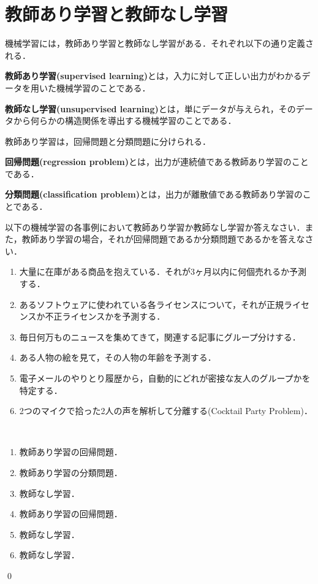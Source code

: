 \section{教師あり学習と教師なし学習}

機械学習には，教師あり学習と教師なし学習がある．それぞれ以下の通り定義される．
\begin{defi}[教師あり学習]
{\bf 教師あり学習(supervised learning)}とは，入力に対して正しい出力がわかるデータを用いた機械学習のことである．
\end{defi}
\begin{defi}[教師なし学習]
{\bf 教師なし学習(unsupervised learning)}とは，単にデータが与えられ，そのデータから何らかの構造関係を導出する機械学習のことである．
\end{defi}

教師あり学習は，回帰問題と分類問題に分けられる．
\begin{defi}[回帰問題]
{\bf 回帰問題(regression problem)}とは，出力が連続値である教師あり学習のことである．
\end{defi}
\begin{defi}[分類問題]
{\bf 分類問題(classification problem)}とは，出力が離散値である教師あり学習のことである．
\end{defi}

\begin{qu}
以下の機械学習の各事例において教師あり学習か教師なし学習か答えなさい．また，教師あり学習の場合，それが回帰問題であるか分類問題であるかを答えなさい．
\begin{enumerate}
	\item 大量に在庫がある商品を抱えている．それが3ヶ月以内に何個売れるか予測する．
	\item あるソフトウェアに使われている各ライセンスについて，それが正規ライセンスか不正ライセンスかを予測する．
	\item 毎日何万ものニュースを集めてきて，関連する記事にグループ分けする．
	\item ある人物の絵を見て，その人物の年齢を予測する．
	\item 電子メールのやりとり履歴から，自動的にどれが密接な友人のグループかを特定する．
	\item 2つのマイクで拾った2人の声を解析して分離する(Cocktail Party Problem)．
\end{enumerate}	
\end{qu}
\begin{ans}　
\begin{enumerate}
	\item 教師あり学習の回帰問題．
	\item 教師あり学習の分類問題．
	\item 教師なし学習．
	\item 教師あり学習の回帰問題．
	\item 教師なし学習．
	\item 教師なし学習．
\end{enumerate}
\qed
\end{ans}